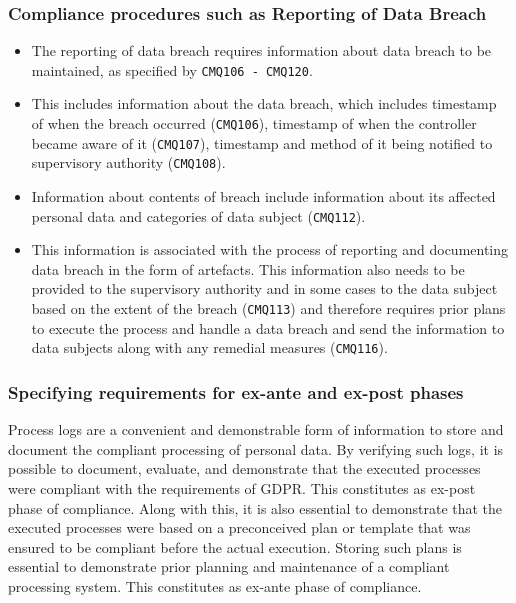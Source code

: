 \subsubsection{Compliance procedures such as Reporting of Data Breach}
\begin{itemize}
    \item The reporting of data breach requires information about data breach to be maintained, as specified by \texttt{CMQ106 - CMQ120}.
    \item This includes information about the data breach, which includes timestamp of when the breach occurred (\texttt{CMQ106}), timestamp of when the controller became aware of it (\texttt{CMQ107}), timestamp and method of it being notified to supervisory authority (\texttt{CMQ108}).
    \item Information about contents of breach include information about its affected personal data and categories of data subject (\texttt{CMQ112}).
    \item This information is associated with the process of reporting and documenting data breach in the form of artefacts. This information also needs to be provided to the supervisory authority and in some cases to the data subject based on the extent of the breach (\texttt{CMQ113}) and therefore requires prior plans to execute the process and handle a data breach and send the information to data subjects along with any remedial measures (\texttt{CMQ116}).
\end{itemize}

\subsubsection{Specifying requirements for ex-ante and ex-post phases}
Process logs are a convenient and demonstrable form of information to store and document the compliant processing of personal data. By verifying such logs, it is possible to document, evaluate, and demonstrate that the executed processes were compliant with the requirements of GDPR. This constitutes as ex-post phase of compliance. Along with this, it is also essential to demonstrate that the executed processes were based on a preconceived plan or template that was ensured to be compliant before the actual execution. Storing such plans is essential to demonstrate prior planning and maintenance of a compliant processing system. This constitutes as ex-ante phase of compliance.

